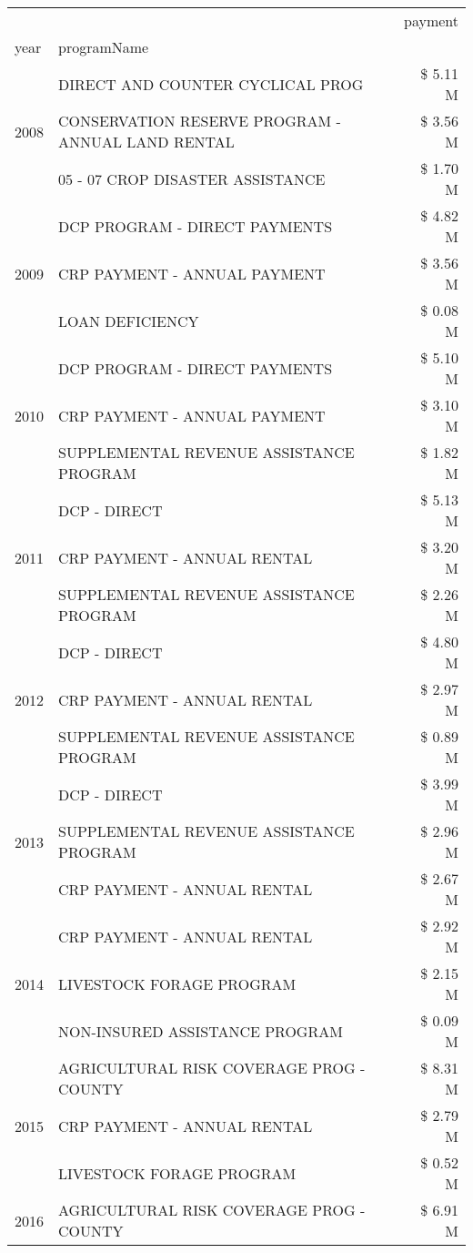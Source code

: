 \begin{tabular}{llr}
\toprule
 &  & payment \\
year & programName &  \\
\midrule
\multirow[t]{3}{*}{2008} & DIRECT AND COUNTER CYCLICAL PROG & \$ 5.11 M \\
 & CONSERVATION RESERVE PROGRAM - ANNUAL LAND RENTAL & \$ 3.56 M \\
 & 05 - 07 CROP DISASTER ASSISTANCE & \$ 1.70 M \\
\cline{1-3}
\multirow[t]{3}{*}{2009} & DCP PROGRAM - DIRECT PAYMENTS & \$ 4.82 M \\
 & CRP PAYMENT - ANNUAL PAYMENT & \$ 3.56 M \\
 & LOAN DEFICIENCY & \$ 0.08 M \\
\cline{1-3}
\multirow[t]{3}{*}{2010} & DCP PROGRAM - DIRECT PAYMENTS & \$ 5.10 M \\
 & CRP PAYMENT - ANNUAL PAYMENT & \$ 3.10 M \\
 & SUPPLEMENTAL REVENUE ASSISTANCE PROGRAM & \$ 1.82 M \\
\cline{1-3}
\multirow[t]{3}{*}{2011} & DCP - DIRECT & \$ 5.13 M \\
 & CRP PAYMENT - ANNUAL RENTAL & \$ 3.20 M \\
 & SUPPLEMENTAL REVENUE ASSISTANCE PROGRAM & \$ 2.26 M \\
\cline{1-3}
\multirow[t]{3}{*}{2012} & DCP - DIRECT & \$ 4.80 M \\
 & CRP PAYMENT - ANNUAL RENTAL & \$ 2.97 M \\
 & SUPPLEMENTAL REVENUE ASSISTANCE PROGRAM & \$ 0.89 M \\
\cline{1-3}
\multirow[t]{3}{*}{2013} & DCP - DIRECT & \$ 3.99 M \\
 & SUPPLEMENTAL REVENUE ASSISTANCE PROGRAM & \$ 2.96 M \\
 & CRP PAYMENT - ANNUAL RENTAL & \$ 2.67 M \\
\cline{1-3}
\multirow[t]{3}{*}{2014} & CRP PAYMENT - ANNUAL RENTAL & \$ 2.92 M \\
 & LIVESTOCK FORAGE PROGRAM & \$ 2.15 M \\
 & NON-INSURED ASSISTANCE PROGRAM & \$ 0.09 M \\
\cline{1-3}
\multirow[t]{3}{*}{2015} & AGRICULTURAL RISK COVERAGE PROG - COUNTY & \$ 8.31 M \\
 & CRP PAYMENT - ANNUAL RENTAL & \$ 2.79 M \\
 & LIVESTOCK FORAGE PROGRAM & \$ 0.52 M \\
\cline{1-3}
\multirow[t]{3}{*}{2016} & AGRICULTURAL RISK COVERAGE PROG - COUNTY & \$ 6.91 M \\

\end{tabular}
